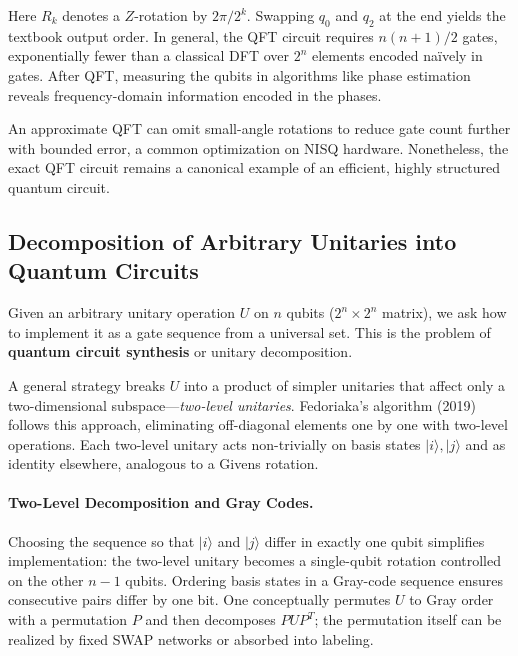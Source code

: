Here $R_k$ denotes a $Z$-rotation by $2\pi/2^{k}$.\cite{NielsenChuang2010} Swapping $q_0$ and $q_2$ at the end yields the textbook output order.\cite{Cleve1998qft} In general, the QFT circuit requires $n(n+1)/2$ gates, exponentially fewer than a classical DFT over $2^{n}$ elements encoded naïvely in gates.\cite{NielsenChuang2010} After QFT, measuring the qubits in algorithms like phase estimation reveals frequency-domain information encoded in the phases.\cite{Kitaev1995phase}

An approximate QFT can omit small-angle rotations to reduce gate count further with bounded error, a common optimization on NISQ hardware.\cite{Barenco1996approxqft} Nonetheless, the exact QFT circuit remains a canonical example of an efficient, highly structured quantum circuit.\cite{Shor1994}

\subsection{Decomposition of Arbitrary Unitaries into Quantum Circuits}

Given an arbitrary unitary operation $U$ on $n$ qubits ($2^{n}\!\times\!2^{n}$ matrix), we ask how to implement it as a gate sequence from a universal set.\cite{Shende2006synthesis} This is the problem of \textbf{quantum circuit synthesis} or unitary decomposition.

A general strategy breaks $U$ into a product of simpler unitaries that affect only a two-dimensional subspace—\emph{two-level unitaries}.\cite{Reck1994optics} Fedoriaka's algorithm (2019) follows this approach, eliminating off-diagonal elements one by one with two-level operations.\cite{fedoriaka2025decomposition} Each two-level unitary acts non-trivially on basis states $|i\rangle,|j\rangle$ and as identity elsewhere, analogous to a Givens rotation.\cite{Reck1994optics}

\paragraph{Two-Level Decomposition and Gray Codes.} 
Choosing the sequence so that $|i\rangle$ and $|j\rangle$ differ in exactly one qubit simplifies implementation: the two-level unitary becomes a single-qubit rotation controlled on the other $n\!-\!1$ qubits.\cite{Barenco1995elementary} Ordering basis states in a Gray-code sequence ensures consecutive pairs differ by one bit.\cite{Bullock2004gray} One conceptually permutes $U$ to Gray order with a permutation $P$ and then decomposes $PUP^T$; the permutation itself can be realized by fixed SWAP networks or absorbed into labeling.\cite{Bullock2004gray}

